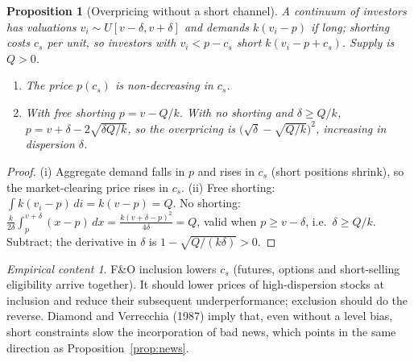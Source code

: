 \documentclass[11pt,a4paper]{article}
\theoremstyle{plain}
\newtheorem{proposition}{Proposition}
\theoremstyle{definition}
\theoremstyle{remark}
\newtheorem*{test}{Empirical content}
\begin{document}
\begin{proposition}[Overpricing without a short channel]\label{prop:miller}
A continuum of investors has valuations $v_i\sim U[v-\delta,v+\delta]$ and demands $k(v_i-p)$ if long; shorting costs $c_s$
per unit, so investors with $v_i<p-c_s$ short $k(v_i-p+c_s)$. Supply is $Q>0$.
\begin{enumerate}[label=(\roman*),leftmargin=1.8em,itemsep=1pt]
\item The price $p(c_s)$ is non-decreasing in $c_s$.
\item With free shorting $p=v-Q/k$. With no shorting and $\delta\ge Q/k$, $p=v+\delta-2\sqrt{\delta Q/k}$, so the
overpricing is $\big(\sqrt{\delta}-\sqrt{Q/k}\big)^2$, increasing in dispersion $\delta$.
\end{enumerate}
\end{proposition}
\begin{proof}
(i) Aggregate demand falls in $p$ and rises in $c_s$ (short positions shrink), so the market-clearing price rises in $c_s$.
(ii) Free shorting: $\int k(v_i-p)\,di=k(v-p)=Q$. No shorting: $\frac{k}{2\delta}\int_p^{v+\delta}(x-p)\,dx=\frac{k(v+\delta-p)^2}{4\delta}=Q$,
valid when $p\ge v-\delta$, i.e.\ $\delta\ge Q/k$. Subtract; the derivative in $\delta$ is $1-\sqrt{Q/(k\delta)}>0$.
\end{proof}
\begin{test}
F\&O inclusion lowers $c_s$ (futures, options and short-selling eligibility arrive together). It should lower
prices of high-dispersion stocks at inclusion and reduce their subsequent underperformance; exclusion should do the
reverse. Diamond and Verrecchia (1987) imply that, even without a level bias, short constraints slow the incorporation of
bad news, which points in the same direction as Proposition~\ref{prop:news}.
\end{test}

\end{document}
